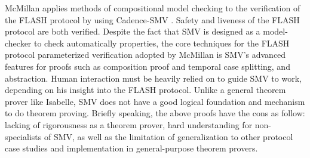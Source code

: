 \documentclass{llncs-new}
\newcommand{\forget}[1]{}
\begin{document}
McMillan applies methods of compositional model
checking \cite{McMillan2001} to the verification of the FLASH protocol by using Cadence-SMV \cite{cadenceSMV}. %
Safety and liveness of the
FLASH protocol are both verified. Despite the fact that SMV is designed as a model-checker to  check automatically properties, the core techniques for the FLASH protocol parameterized verification adopted by McMillan is SMV's advanced features for proofs such as composition proof and temporal case splitting, and abstraction. Human interaction must be heavily relied on to  guide SMV to work, depending on his insight into the FLASH protocol. Unlike a general theorem prover like Isabelle, SMV does not have a good logical foundation and mechanism to do theorem proving. Briefly speaking, the above proofs have the cons as follow: lacking of rigorousness as a theorem prover, hard understanding for non-specialists of SMV, as well as the limitation of generalization to other protocol case studies and implementation in general-purpose theorem provers. \forget{The above proofs are neither rigorous as a theorem prover, nor easily understood to a non-specialist of SMV.  Because these proof techniques are  only special for SMV,  they are  difficult to be generalized to other protocols and to be implemented in a general-purpose theorem prover.}
\end{document}
